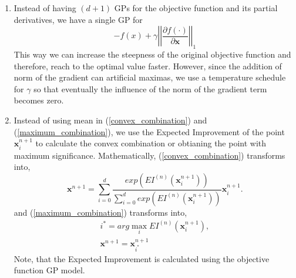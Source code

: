 \documentclass{article}
\begin{document}
\begin{enumerate}
        \item
            Instead of having $(d+1)$ GPs for the objective function and its partial derivatives, we have a single GP for 
            \begin{equation}
                -f(x) + \gamma\left | \left | \frac {\partial f(\cdot)}{\partial \textbf{x}} \right | \right|_1
            \end{equation}
            This way we can increase the steepness of the original objective function and therefore, reach to the optimal value faster. However, since the 
            addition of norm of the gradient can artificial maximas, we use a temperature schedule for $\gamma$ so that eventually the influence of the 
            norm of the gradient term becomes zero.

        \item
            Instead of using mean in (\ref{convex_combination}) and (\ref{maximum_combination}), we use the Expected Improvement of the point 
            $\textbf{x}_{i}^{n+1}$ to calculate the convex combination or obtianing the point with maximum significance. Mathematically, 
            (\ref{convex_combination}) transforms into, 
            \begin{equation}
                \textbf {x}^{n+1} = \sum_{i=0}^{d} \frac {exp(EI^{(n)}(\textbf{x}^{n+1}_{i}))}{\sum_{i=0}^{d} exp(EI^{(n)}(\textbf{x}^{n+1}_{i}))} \textbf{x}^{n+1}_{i}.
            \end{equation}
            and (\ref{maximum_combination}) transforms into,
            \begin{equation}
            \begin{split}
                i^{*} = arg \max_{i} EI^{(n)}(\textbf{x}^{n+1}_{i}), \\
                \textbf{x}^{n+1} = \textbf{x}^{n+1}_{i^{*}}
            \end{split}
            \end{equation}
            Note, that the Expected Improvement is calculated using the objective function GP model.
    \end{enumerate}
\end{document}
